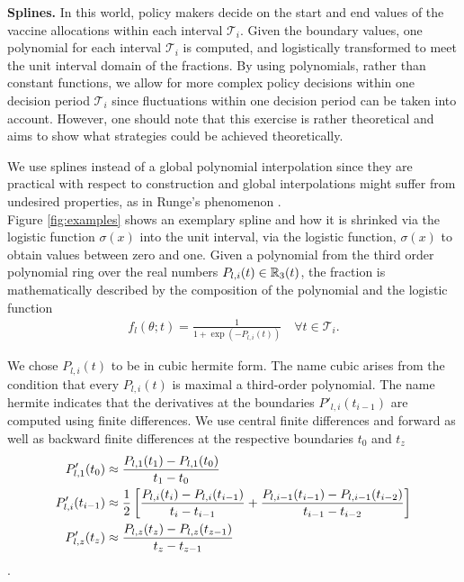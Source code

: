 \textbf{Splines.} In this world, policy makers decide on the start and end values of the vaccine allocations within each interval $\mathcal{T}_i$. Given the boundary values, one polynomial for each interval $\mathcal{T}_i$ is computed, and logistically transformed to meet the unit interval domain of the fractions. By using polynomials, rather than constant functions, we allow for more complex policy decisions within one decision period $\mathcal{T}_i$ since fluctuations within one decision period can be taken into account. However, one should note that this exercise is rather theoretical and aims to show what strategies could be achieved theoretically.

We use splines instead of a global polynomial interpolation since they are practical with respect to construction and global interpolations might suffer from undesired properties, as in Runge's phenomenon \citep{Runge.1901}.\\
 
%
Figure \ref{fig:examples} shows an exemplary spline and how it is shrinked via the logistic function $\sigma(x)$ into the unit interval, via the logistic function, $\sigma(x)$ to obtain values between zero and one.  %
Given a polynomial from the third order polynomial ring over the real numbers $P_{l,i}(t) \in \mathbb{R}_3(t)$, the fraction is mathematically described by the composition of the polynomial and the logistic function
\begin{align}
f_{l}(\theta; t) =  \frac{1}{1 + \exp{(-P_{l,i}(t))}} \quad \forall t \in \mathcal{T}_i. 
\end{align}

We chose $P_{l,i}(t)$ to be in cubic hermite form. The name cubic arises from the condition that every $P_{l,i}(t)$ is maximal a third-order polynomial. The name hermite indicates that the derivatives at the boundaries $P'_{l,i}(t_{i-1})$ are computed using finite differences. We use central finite differences and forward as well as backward finite differences at the respective boundaries $t_0$ and $t_{z}$
\begin{align}
\label{eq:finite_differences}
P'_{l,1}(t_0) &\approx \frac{P_{l,1}(t_1) - P_{l,1}(t_0)}{t_1 - t_0} \\
P'_{l,i}(t_{i-1}) &\approx \frac{1}{2}\left[\frac{P_{l,i}(t_{i}) - P_{l,i}(t_{i-1})}{t_{i} - t_{i-1}} + \frac{P_{l,i-1}(t_{i-1}) - P_{l,i-1}( t_{i-2})}{t_{i-1} - t_{i-2}} \right] \notag \\
P'_{l,z}(t_{z}) &\approx \frac{P_{l,z}(t_{z}) - P_{l,z}(t_{z-1})}{t_{z} - t_{z-1}} \notag 
\end{align}. 

